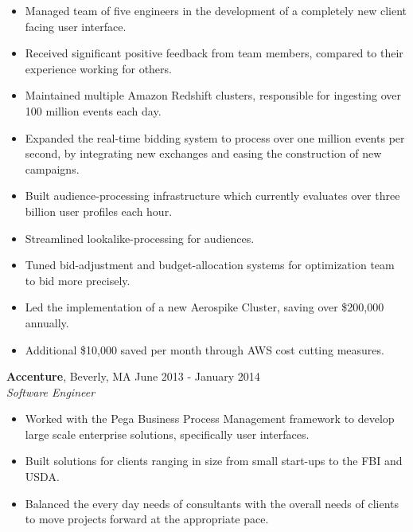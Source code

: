 \documentclass[11pt]{res} %
\begin{document}
\begin{resume}
\vspace{0.01in} %
   \begin{itemize} \itemsep -2pt  %
   \item Managed team of five engineers in the development of a completely new
     client facing user interface.
   \item Received significant positive feedback from team members, compared to
     their experience working for others.
   \item Maintained multiple Amazon Redshift clusters, responsible for ingesting
     over 100 million events each day.
   \item Expanded the real-time bidding system to process over one million
     events per second, by integrating new exchanges and easing the construction
     of new campaigns.
   \item Built audience-processing infrastructure which
     currently evaluates over three billion user profiles each hour.
   \item Streamlined lookalike-processing for audiences.
   \item Tuned bid-adjustment and budget-allocation systems for
     optimization team to bid more precisely.
   \item Led the implementation of a new Aerospike Cluster, saving over
     \$200,000 annually.
   \item Additional \$10,000 saved per month through AWS cost cutting measures.
   \end{itemize}



{\bf Accenture}, Beverly, MA \hfill June 2013 - January 2014 \\
{\it Software Engineer}
\vspace{0.01in} %
   \begin{itemize} \itemsep -2pt  %
   \item Worked with the Pega Business Process Management framework to develop
   large scale enterprise solutions,
   specifically user interfaces.
   \item Built solutions for clients ranging in size from small start-ups to the
     FBI and USDA.
   \item Balanced the every day needs of consultants with the overall needs
     of clients to move projects forward at the appropriate pace.
   \end{itemize}



\end{resume}
\end{document}
